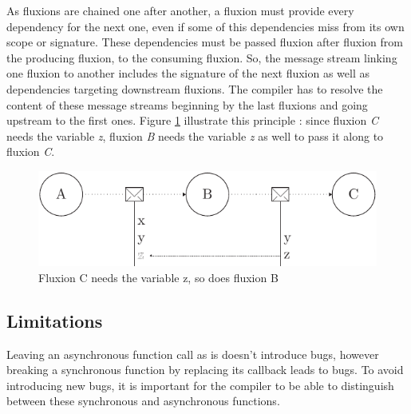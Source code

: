 



As fluxions are chained one after another, a fluxion must provide every dependency for the next one, even if some of this dependencies miss from its own scope or signature.
These dependencies must be passed fluxion after fluxion from the producing fluxion, to the consuming fluxion.
So, the message stream linking one fluxion to another includes the signature of the next fluxion as well as dependencies targeting downstream fluxions.
The compiler has to resolve the content of these message streams beginning by the last fluxions and going upstream to the first ones.
Figure \ref{fig:streamline} illustrate this principle : since fluxion \textit{C} needs the variable \textit{z}, fluxion \textit{B} needs the variable \textit{z} as well to pass it along to fluxion \textit{C}.

\begin{figure}[h!]
  \includegraphics[width=\linewidth]{ressources/streamline.pdf}
  \caption{Fluxion C needs the variable z, so does fluxion B}
  \label{fig:streamline}
\end{figure}

\subsection{Limitations} \label{ss:Limitations}

Leaving an asynchronous function call as is doesn't introduce bugs, however breaking a synchronous function by replacing its callback leads to bugs.
To avoid introducing new bugs, it is important for the compiler to be able to distinguish between these synchronous and asynchronous functions.

